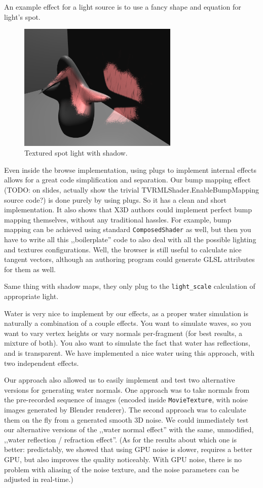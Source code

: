 \documentclass{acmsiggraph}                     %
\begin{document}
An example effect for a light source is to use a fancy shape and equation
for light's spot.

\begin{figure}[H]
  \centering
  \includegraphics[width=3in]{fancy_light_spot_shape}
  \caption{Textured spot light with shadow.}
\end{figure}

Even inside the browse implementation, using plugs to implement internal
effects allows for a great code simplification and separation.
Our bump mapping effect (TODO: on slides, actually show
the trivial TVRMLShader.EnableBumpMapping source code?)
is done purely by using plugs.
So it has a clean and short implementation. It also shows that
X3D authors could implement perfect bump mapping themselves,
without any traditional hassles. For example, bump mapping can be
achieved using standard \texttt{ComposedShader} as well,
but then you have to write all this ,,boilerplate'' code to also deal
with all the possible lighting and textures configurations.
Well, the browser is still useful to calculate nice tangent vectors,
although an authoring program could generate GLSL attributes for them as well.

Same thing with shadow maps, they only plug to the \texttt{light\_scale}
calculation of appropriate light.

Water is very nice to implement by our effects, as a proper water simulation
is naturally a combination of a couple effects.
You want to simulate waves, so you want to vary vertex
heights or vary normals per-fragment (for best results, a mixture of both).
You also want to simulate the fact that water has reflections, and
is transparent. We have implemented a nice water using this approach,
with two independent effects.

Our approach also allowed us to easily implement and test
two alternative versions for generating water normals.
One approach was to take normals from the pre-recorded sequence of images
(encoded inside \texttt{MovieTexture},
with noise images generated by Blender renderer).
The second approach was to calculate them on the fly from
a generated smooth 3D noise. We could immediately test our alternative versions
of the ,,water normal effect'' with the same, unmodified,
,,water reflection / refraction effect''.
(As for the results about which one is better: predictably, we showed
that using GPU noise is slower, requires a better GPU,
but also improves the quality noticeably. With GPU noise, there is no problem
with aliasing of the noise texture, and the noise parameters can be adjusted
in real-time.)
\end{document}
